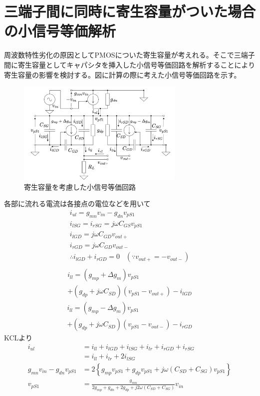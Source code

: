 \documentclass[twocolumn]{jsarticle}
\begin{document}
\section{三端子間に同時に寄生容量がついた場合の小信号等価解析}
    周波数特性劣化の原因としてPMOSについた寄生容量が考えれる。そこで三端子間に寄生容量としてキャパシタを挿入した小信号等価回路を解析することにより寄生容量の影響を検討する。図に計算の際に考えた小信号等価回路を示す。
    \begin{figure}[h]
        \begin{center}
            \includegraphics*[width=80mm]{figures/ParasiticCapacitoresEquivalent.png}
            \caption{寄生容量を考慮した小信号等価回路}
            \label{label:paracitic_eq}
        \end{center}
    \end{figure}
    各部に流れる電流は各接点の電位などを用いて  
    \begin{gather*}
        i_{ul}=g_{mn}v_{in}-g_{dn}v_{pS1}   \\
        i_{lSG}=i_{rSG}=j\omega C_{GS}v_{pS1}       \\
        i_{lGD}=j\omega C_{GD}v_{out+}      \\
        i_{rGD}=j\omega C_{GD}v_{out-}      \\
        \therefore i_{lGD}+i_{rGD}=0\;\;\;(\because v_{out+}=-v_{out-})     \\
    \end{gather*}
    \begin{multline*}
        i_{ll} = (g_{mp}+\Delta g_{m})v_{pS1}\\+(g_{dp}+j\omega C_{SD})(v_{pS1}-v_{out+})-i_{lGD}
    \end{multline*}
    \begin{multline*}
        i_{ll} = (g_{mp}-\Delta g_{m})v_{pS1}\\+(g_{dp}+j\omega C_{SD})(v_{pS1}-v_{out-})-i_{rGD}    
    \end{multline*}
    KCLより
    \begin{align*}
        i_{ul} &= i_{ll}+i_{lGD}+i_{lSG}+i_{lr}+i_{rGD}+i_{rSG}    \\
        &= i_{ll}+i_{lr}+2i_{lSG}   \\
        g_{mn}v_{in}-g_{dn}v_{pS1} &= 2\left\{ g_{mp}v_{pS1}+g_{dp}v_{pS1}+ j\omega( C_{SD}+C_{SG} ) v_{pS1} \right\}   \\
        v_{pS1} &= \frac{g_{mn}}{ 2g_{mp}+g_{dn}+2g_{dp}+j2\omega (C_{SD}+C_{SG}) }v_{in}
    \end{align*}
\end{document}

